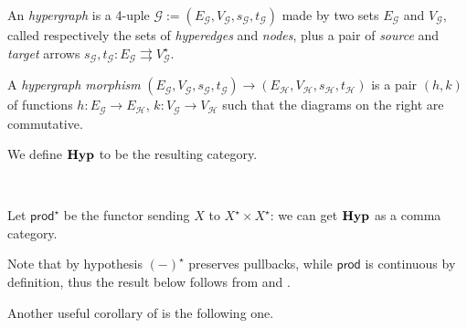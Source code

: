 \documentclass[a4paper,UKenglish,cleveref,pdftex,thm-restate,numberwithinsect]{lipics-v2021}
\newcommand{\Set}{\mathbf{Set}}
\def\E{\textbf {\textup{E}}}
\newcommand{\catname}[1]{\textbf{\textup{#1}}}
\newcommand{\hyp}{\catname{Hyp}}
\newcommand{\pro}{\mathsf{prod}}
\newcommand{\comma}[2]{#1\hspace{1pt} {\downarrow}#2}
\newcommand{\id}[1]{\mathsf{id}_{#1}}
\begin{document}
\noindent 
\parbox{10.8cm}{\begin{definition}An \emph{hypergraph} is a 4-uple $\mathcal{G}:=(E_\mathcal{G}, V_\mathcal{G}, s_\mathcal{G}, t_\mathcal{G})$ made by two sets $E_\mathcal{G}$ and $V_\mathcal{G}$, called respectively the sets of \emph{hyperedges} and \emph{nodes}, plus a pair of \emph{source} and \emph{target} arrows  $s_\mathcal{G}, t_\mathcal{G}\colon E_\mathcal{G}\rightrightarrows V_\mathcal{G}^\star$. 
		
\hspace{10pt} A \emph{hypergraph morphism} $(E_\mathcal{G}, V_\mathcal{G}, s_\mathcal{G}, t_\mathcal{G})\to (E_\mathcal{H}, V_\mathcal{H}, s_\mathcal{H}, t_\mathcal{H})$ is a pair $(h,k)$ of functions $h\colon E_\mathcal{G}\to E_\mathcal{H}$, $k\colon V_\mathcal{G}\to V_\mathcal{H}$ such that the diagrams on the right are commutative.

\hspace{10pt}	We define $\hyp$ to be the resulting category.
\end{definition}}\hfill\parbox{3cm}{ \hspace{1pt}\\  }

Let $\pro^\star$ be the functor sending $X$ to $X^\star\times X^\star$: we can get $\hyp$ as a comma category.


Note that by hypothesis $(-)^\star$ preserves pullbacks, while $\pro$ is continuous by definition, thus the result below follows from   and .   


Another useful corollary of  is the following one.
\end{document}
